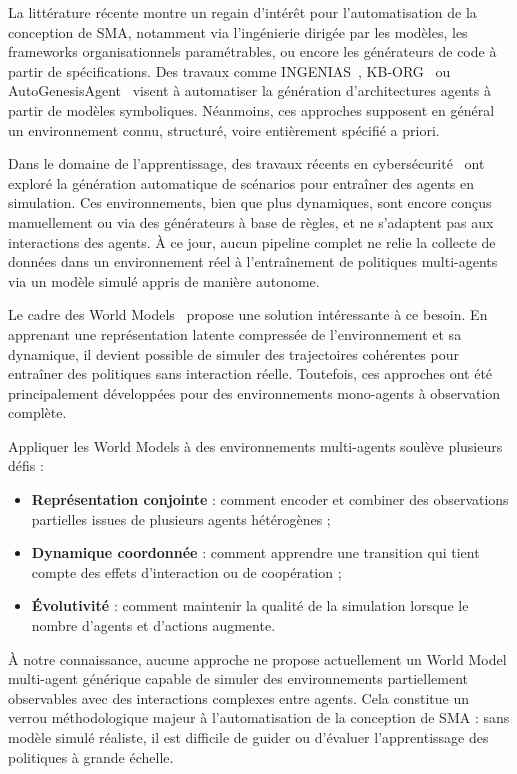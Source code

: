 \medskip

\noindent
La littérature récente montre un regain d'intérêt pour l'automatisation de la conception de \ac{SMA}, notamment via l'ingénierie dirigée par les modèles, les frameworks organisationnels paramétrables, ou encore les générateurs de code à partir de spécifications. Des travaux comme INGENIAS~\cite{Pavon2003}, KB-ORG~\cite{Sims2008} ou AutoGenesisAgent~\cite{harper2024autogenesisagent} visent à automatiser la génération d'architectures agents à partir de modèles symboliques. Néanmoins, ces approches supposent en général un environnement connu, structuré, voire entièrement spécifié a priori.

\noindent
Dans le domaine de l'apprentissage, des travaux récents en cybersécurité~\cite{hammar2023scalable} ont exploré la génération automatique de scénarios pour entraîner des agents en simulation. Ces environnements, bien que plus dynamiques, sont encore conçus manuellement ou via des générateurs à base de règles, et ne s'adaptent pas aux interactions des agents. À ce jour, aucun pipeline complet ne relie la collecte de données dans un environnement réel à l'entraînement de politiques multi-agents via un modèle simulé appris de manière autonome.

\medskip

\noindent
Le cadre des World Models~\cite{Ha2018} propose une solution intéressante à ce besoin. En apprenant une représentation latente compressée de l'environnement et sa dynamique, il devient possible de simuler des trajectoires cohérentes pour entraîner des politiques sans interaction réelle. Toutefois, ces approches ont été principalement développées pour des environnements mono-agents à observation complète.

\noindent
Appliquer les World Models à des environnements multi-agents soulève plusieurs défis :
\begin{itemize}
    \item \textbf{Représentation conjointe} : comment encoder et combiner des observations partielles issues de plusieurs agents hétérogènes ;
    \item \textbf{Dynamique coordonnée} : comment apprendre une transition qui tient compte des effets d'interaction ou de coopération ;
    \item \textbf{Évolutivité} : comment maintenir la qualité de la simulation lorsque le nombre d'agents et d'actions augmente.
\end{itemize}

\noindent
À notre connaissance, aucune approche ne propose actuellement un World Model multi-agent générique capable de simuler des environnements partiellement observables avec des interactions complexes entre agents. Cela constitue un verrou méthodologique majeur à l'automatisation de la conception de \ac{SMA} : sans modèle simulé réaliste, il est difficile de guider ou d'évaluer l'apprentissage des politiques à grande échelle.

